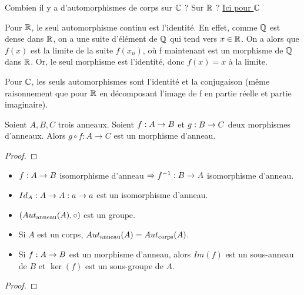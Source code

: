 \begin{question}
	Combien il y a d'automorphismes de corps sur $\mathbb{C}$ ? Sur $\mathbb{R}$ ?
	\href{http://www.math.uga.edu/~pete/Kestelman51.pdf}{Ici pour $\mathbb{C}$}

	Pour $\mathbb{R}$, le seul automorphisme continu est l'identité. En effet, comme
	$\mathbb{Q}$ est dense dans $\mathbb{R}$, on a une suite d'élément de $\mathbb{Q}$
	qui tend vers $x \in \mathbb{R}$. On a alors que $f(x)$ est la limite de la suite
	$f(x_{n})$, où f maintenant est un morphisme de $\mathbb{Q}$ dans $\mathbb{R}$.
	Or, le seul morphisme est l'identité, donc $f(x) = x$ à la limite.

	Pour $\mathbb{C}$, les seuls automorphismes sont l'identité et la conjugaison
	(même raisonnement que pour $\mathbb{R}$ en décomposant l'image de f en partie
	réelle et partie imaginaire).
\end{question}

\begin{proposition}
	Soient $A, B, C$ trois anneaux.
	Soient $f : A \rightarrow B$ et $g : B \rightarrow C$ deux morphismes
	d'anneaux. Alors $g \circ f : A \rightarrow C$ est un morphisme d'anneau.
\end{proposition}

\ifdefined\outputproof
\begin{proof}

\end{proof}
\fi

\begin{proposition}
	\begin{itemize}
		\item $f : A \rightarrow B$ isomorphisme d'anneau $\Rightarrow
			f^{-1} : B \rightarrow A$ isomorphisme d'anneau.
		\item $Id_{A} : A \rightarrow A : a \rightarrow a$ est un isomorphisme
			d'anneau.
		\item $(Aut_{\text{anneau}}(A), \circ)$ est un groupe.
		\item Si $A$ est un corps, $Aut_{\text{anneau}}(A) =
			Aut_{\text{corps}}(A)$.
		\item Si $f : A \rightarrow B$ est un morphisme d'anneau, alors
			$Im(f)$ est un sous-anneau de $B$ et $\ker(f)$ est un sous-groupe de
			$A$.
	\end{itemize}
\end{proposition}

\ifdefined\outputproof
\begin{proof}

\end{proof}
\fi

